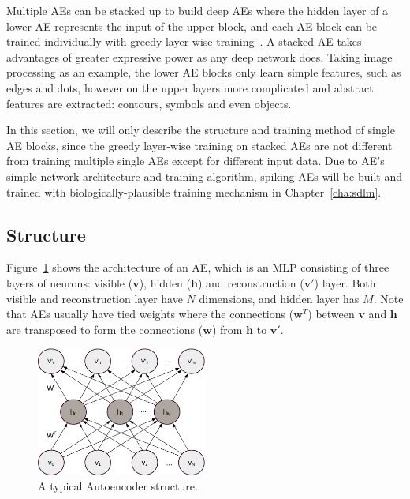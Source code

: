 Multiple AEs can be stacked up to build deep AEs where the hidden layer of a lower AE represents the input of the upper block, and each AE block can be trained individually with greedy layer-wise training~\cite{hinton2006fast}.
A stacked AE takes advantages of greater expressive power as any deep network does.
Taking image processing as an example, the lower AE blocks only learn simple features, such as edges and dots, however on the upper layers more complicated and abstract features are extracted: contours, symbols and even objects. 

In this section, we will only describe the structure and training method of single AE blocks, since the greedy layer-wise training on stacked AEs are not different from training multiple single AEs except for different input data.
Due to AE's simple network architecture and training algorithm, spiking AEs will be built and trained with biologically-plausible training mechanism in Chapter~\ref{cha:sdlm}.

\subsection{Structure}
Figure~\ref{fig:AE} shows the architecture of an AE, which is an MLP consisting of three layers of neurons: visible ($\mathbf{v}$), hidden ($\mathbf{h}$) and reconstruction ($\mathbf{v'}$) layer.
Both visible and reconstruction layer have $N$ dimensions, and hidden layer has $M$.
Note that AEs usually have tied weights where the connections ($\mathbf{w}^T$) between $\mathbf{v}$ and $\mathbf{h}$ are transposed to form the connections ($\mathbf{w}$) from $\mathbf{h}$ to $\mathbf{v'}$.


\begin{figure}
	\centering
	\includegraphics[width=0.5\textwidth]{pics_sdlm/AE.pdf}
	\caption{A typical Autoencoder structure.}
	\label{fig:AE}
\end{figure}


